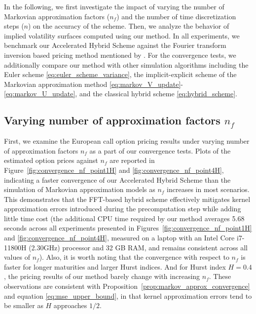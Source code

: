 \documentclass[11pt]{article}%
\theoremstyle{definition}
\begin{document}
In the following, we first investigate the impact of varying the number of Markovian approximation factors (\(n_f\)) and the number of time discretization steps (\(n\)) on the accuracy of the scheme. Then, we analyze the behavior of implied volatility surfaces computed using our method. In all experiments, we benchmark our Accelerated Hybrid Scheme against the Fourier transform inversion based pricing method mentioned by \cite{abijaber2018}. For the convergence tests, we additionally compare our method with other simulation algorithms including the Euler scheme \eqref{eq:euler_scheme_variance}, the implicit-explicit scheme of the Markovian approximation method \eqref{eq:markov_V_update}-\eqref{eq:markov_U_update}, and the classical hybrid scheme \eqref{eq:hybrid_scheme}. 


\subsection{Varying number of approximation factors \(n_f\)}

First, we examine the European call option pricing results under varying number of approximation factors \(n_f\) as a part of our convergence tests. Plots of the estimated option prices against \(n_f\) are reported in Figure~\ref{fig:convergence_nf_point1H} and \ref{fig:convergence_nf_point4H}, indicating a faster convergence of our Accelerated Hybrid Scheme than the simulation of Markovian approximation models as \(n_f\) increases in most scenarios. This demonstrates that the FFT-based hybrid scheme effectively mitigates kernel approximation errors introduced during the precomputation step while adding little time cost (the additional CPU time required by our method averages 5.68 seconds across all experiments presented in Figures~\ref{fig:convergence_nf_point1H} and \ref{fig:convergence_nf_point4H}, measured on a laptop with an Intel Core i7-11800H (2.30GHz) processor and 32 GB RAM, and remains consistent across all values of $n_f$). Also, it is worth noting that the convergence with respect to \(n_f\) is faster for longer maturities and larger Hurst indices. And for Hurst index \(H=0.4\), the pricing results of our method barely change with increasing \(n_f\). These observations are consistent with Proposition~\ref{prop:markov_approx_convergence} and equation \eqref{eq:mse_upper_bound}, in that kernel approximation errors tend to be smaller as \(H\) approaches \(1/2\). 
\end{document}
